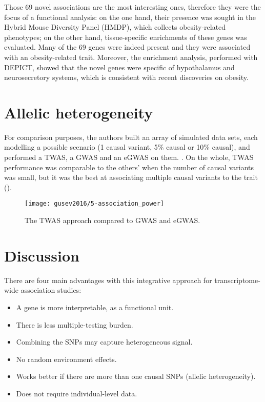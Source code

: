 \documentclass[../main.tex]{subfiles}
\begin{document}
Those 69 novel associations are the most interesting ones, therefore 
they were the focus of a functional analysis: on the one hand, their 
presence was sought in the Hybrid Mouse Diversity Panel (HMDP), which 
collects obesity-related phenotypes; on the other hand, tissue-specific 
enrichments of these genes was evaluated. Many of the 69 genes were 
indeed present and they were associated with an obesity-related trait. 
Moreover, the enrichment analysis, performed with DEPICT, showed that 
the novel genes were specific of hypothalamus and neurosecretory 
systems, which is consistent with recent discoveries on obesity.

\section{Allelic heterogeneity}

For comparison purposes, the authors built an array of simulated data 
sets, each modelling a possible scenario (1 causal variant, 5\% causal 
or 10\% causal), and performed a TWAS, a GWAS and an eGWAS on them. 
. On the whole, TWAS performance was comparable to 
the others' when the number of causal variants was small, but it was the 
best at associating multiple causal variants to the trait 
().

\begin{figure}
	\texttt{[image: gusev2016/5-association\_power]}
	\caption{The TWAS approach compared to GWAS and eGWAS.}
\end{figure}


\section{Discussion}

There are four main advantages with this integrative approach for 
transcriptome-wide association studies:

\begin{itemize}
	\item A gene is more interpretable, as a functional unit.
	\item There is less multiple-testing burden.
	\item Combining the SNPs may capture heterogeneous signal.
	\item No random environment effects.
	\item Works better if there are more than one causal SNPs (allelic 
heterogeneity).
	\item Does not require individual-level data.
\end{itemize}
\end{document}
